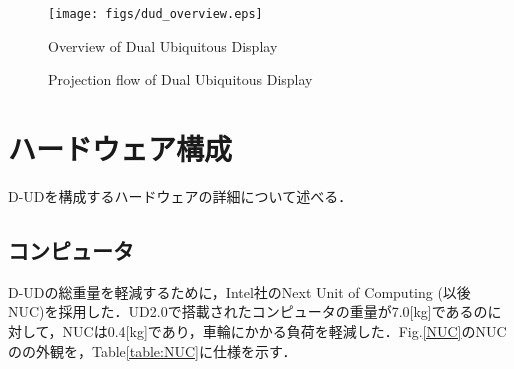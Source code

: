\documentclass[12pt]{sonota/aislab}
\begin{document}
\begin{figure}[t]
\begin{center}
\texttt{[image: figs/dud\_overview.eps]}
\caption{Overview of Dual Ubiquitous Display}
\label{DUD}
\end{center}
\end{figure}


\begin{figure}[htbp]

	\begin{center}
	\end{center}
	
	\caption{Projection flow of Dual Ubiquitous Display}
	\label{fig:twofig}
\end{figure}



\section{ハードウェア構成}
D-UDを構成するハードウェアの詳細について述べる．
\subsection{コンピュータ}
D-UDの総重量を軽減するために，Intel社のNext Unit of Computing (以後 NUC)を採用した．UD2.0で搭載されたコンピュータの重量が7.0[kg]であるのに対して，NUCは0.4[kg]であり，車輪にかかる負荷を軽減した．Fig.\ref{NUC}のNUCのの外観を，Table\ref{table:NUC}に仕様を示す．
\end{document}
